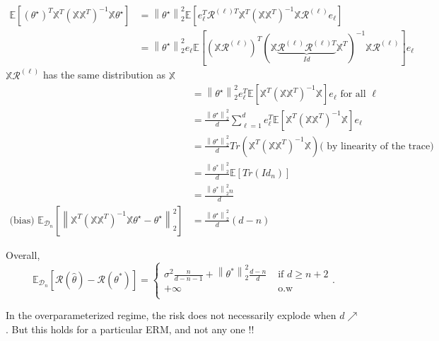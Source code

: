 \begin{itemize}
    \begin{align*}
        \mathbb{E}[ (\theta ^\star )^T \mathbb{X}^T (\mathbb{X} \mathbb{X}^T)^{-1} \mathbb{X} \theta ^\star ] 
            &= \left\| \theta ^\star  \right\| _2 ^2 \mathbb{E} [ e_\ell ^T \mathcal{R}^{(\ell ) T} \mathbb{X}^T (\mathbb{X} \mathbb{X}^T)^{-1} \mathbb{X} \mathcal{R}^{(\ell )} e_\ell ] \\
            &= \left\| \theta ^\star  \right\| _2 ^2 e_\ell \mathbb{E} [ (\mathbb{X} \mathcal{R}^{(\ell )})^T (\mathbb{X} \underbrace{\mathcal{R}^{(\ell )} \mathcal{R}^{(\ell )T}}_{Id} \mathbb{X}^T)^{-1} \mathbb{X} \mathcal{R}^{(\ell )}]e_\ell 
    \end{align*}
    $ \mathbb{X} \mathcal{R}^{(\ell )} $ has the same distribution as $ \mathbb{X} $ 
    \begin{align*}
        &= \left\| \theta ^\star  \right\| _2 ^2 e_\ell ^T \mathbb{E} [ \mathbb{X}^T (\mathbb{X} \mathbb{X}^T )^{-1} \mathbb{X}] e_\ell \text{ for all } \ell \\
        &= \frac{\left\| \theta ^\star  \right\| _2 ^2}{d} \sum_{\ell = 1}^{d} e_\ell ^T \mathbb{E} [ \mathbb{X}^T (\mathbb{X} \mathbb{X}^T)^{-1} \mathbb{X} ] e_\ell \\
        &= \frac{\left\| \theta ^\star  \right\| _2 ^2}{d} Tr (\mathbb{X}^T (\mathbb{X} \mathbb{X}^T)^{-1} \mathbb{X}) \text{( by linearity of the trace)} \\
        &= \frac{\left\| \theta ^\ast  \right\|^2_2 }{d} \mathbb{E}[Tr(Id_n)] \\
        &= \frac{\left\| \theta ^\ast  \right\|^2_2 n}{d} \\
    \text{(bias) } \mathbb{E}_{\mathcal{D}_n} [ \left\| \mathbb{X}^T (\mathbb{X} \mathbb{X}^T)^{-1} \mathbb{X} \theta ^\star - \theta ^\star  \right\| _2 ^2 ] 
        &= \frac{\left\| \theta ^\star  \right\| _2 ^2 }{d} (d - n)
    \end{align*}
\end{itemize}

Overall, 
\[
    \mathbb{E}_ {\mathcal{D}_n}[\mathcal{R}(\hat{\theta }) - \mathcal{R}(\theta ^\ast )] = \begin{cases}
        \sigma ^2 \frac{n}{d-n-1} + \left\| \theta ^\ast  \right\|^2_2 \frac{d-n}{d}  &\text{ if } d \geq n+2\\
        + \infty  &\text{ o.w}\\
    \end{cases} 
.\]

\begin{figure}[H] %
    \centering
\end{figure}

In the overparameterized regime, the risk does not necessarily explode when $ d \nearrow$. But this holds for a particular ERM, and not any one !!